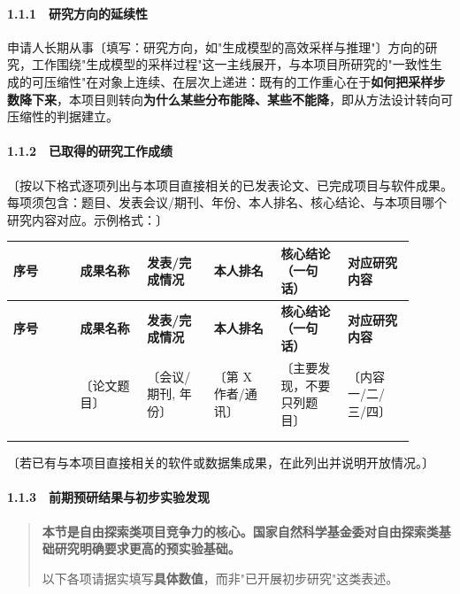\documentclass[12pt,a4paper]{ctexart}
\begin{document}
\paragraph{1.1.1　研究方向的延续性}

申请人长期从事〔填写：研究方向，如"生成模型的高效采样与推理"〕方向的研究，工作围绕"生成模型的采样过程"这一主线展开，与本项目所研究的"一致性生成的可压缩性"在对象上连续、在层次上递进：既有的工作重心在于\textbf{如何把采样步数降下来}，本项目则转向\textbf{为什么某些分布能降、某些不能降}，即从方法设计转向可压缩性的判据建立。

\paragraph{1.1.2　已取得的研究工作成绩}

〔按以下格式逐项列出与本项目直接相关的已发表论文、已完成项目与软件成果。每项须包含：题目、发表会议/期刊、年份、本人排名、核心结论、与本项目哪个研究内容对应。示例格式：〕

\begin{longtable}{|>{\raggedright\arraybackslash}p{0.150\linewidth}|>{\raggedright\arraybackslash}p{0.150\linewidth}|>{\raggedright\arraybackslash}p{0.150\linewidth}|>{\raggedright\arraybackslash}p{0.150\linewidth}|>{\raggedright\arraybackslash}p{0.150\linewidth}|>{\raggedright\arraybackslash}p{0.150\linewidth}|}
\hline
\textbf{序号} & \textbf{成果名称} & \textbf{发表/完成情况} & \textbf{本人排名} & \textbf{核心结论（一句话）} & \textbf{对应研究内容} \\
\hline
\endfirsthead
\hline
\textbf{序号} & \textbf{成果名称} & \textbf{发表/完成情况} & \textbf{本人排名} & \textbf{核心结论（一句话）} & \textbf{对应研究内容} \\
\hline
\endhead
1 & 〔论文题目〕 & 〔会议/期刊, 年份〕 & 〔第 X 作者/通讯〕 & 〔主要发现，不要只列题目〕 & 〔内容一/二/三/四〕 \\
\hline
2 &  &  &  &  &  \\
\hline
3 &  &  &  &  &  \\
\hline
\end{longtable}

〔若已有与本项目直接相关的软件或数据集成果，在此列出并说明开放情况。〕

\paragraph{1.1.3　前期预研结果与初步实验发现}

\begin{quote}\small
\textbf{本节是自由探索类项目竞争力的核心。国家自然科学基金委对自由探索类基础研究明确要求更高的预实验基础。}

以下各项请据实填写\textbf{具体数值}，而非"已开展初步研究"这类表述。

\end{quote}
\end{document}
